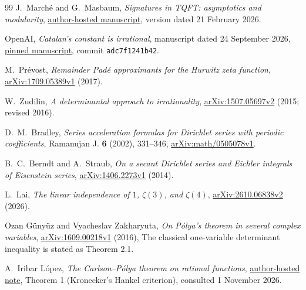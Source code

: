 \begin{thebibliography}{99}
 J.~March\'e and G.~Masbaum,
\emph{Signatures in TQFT: asymptotics and modularity},
\href{https://webusers.imj-prg.fr/~julien.marche/papiers/Sign_Mod.pdf}{author-hosted manuscript},
version dated 21 February 2026.

 OpenAI, \emph{Catalan's constant is irrational},
manuscript dated 24 September 2026,
\href{https://github.com/openai/math/blob/adc7f1241b42e322a6451854ab7e4b4c146bf78a/preprints/Catalans-constant-is-irrational-September-24-2026/paper.pdf}{pinned manuscript},
commit \texttt{adc7f1241b42}.

 M.~Pr\'evost,
\emph{Remainder Pad\'e approximants for the Hurwitz zeta function},
\href{https://arxiv.org/abs/1709.05389v1}{arXiv:1709.05389v1} (2017).

 W.~Zudilin,
\emph{A determinantal approach to irrationality},
\href{https://arxiv.org/abs/1507.05697v2}{arXiv:1507.05697v2}
(2015; revised 2016).

 D.~M.~Bradley,
\emph{Series acceleration formulas for Dirichlet series with periodic coefficients},
Ramanujan J. \textbf{6} (2002), 331--346,
\href{https://arxiv.org/abs/math/0505078v1}{arXiv:math/0505078v1}.

 B.~C.~Berndt and A.~Straub,
\emph{On a secant Dirichlet series and Eichler integrals of Eisenstein series},
\href{https://arxiv.org/abs/1406.2273v1}{arXiv:1406.2273v1} (2014).

 L.~Lai,
\emph{The linear independence of $1$, $\zeta(3)$, and $\zeta(4)$},
\href{https://arxiv.org/abs/2610.06838v2}{arXiv:2610.06838v2} (2026).

 Ozan G\"uny\"uz and Vyacheslav Zakharyuta,
\emph{On P\'olya's theorem in several complex variables},
\href{https://arxiv.org/abs/1609.00218v1}{arXiv:1609.00218v1} (2016),
The classical one-variable determinant inequality is stated as Theorem 2.1.

 A.~Iribar L\'opez,
\emph{The Carlson--P\'olya theorem on rational functions},
\href{https://people.math.ethz.ch/~airibar/Polya_Carlson.pdf}{author-hosted note},
Theorem 1 (Kronecker's Hankel criterion), consulted 1 November 2026.
\end{thebibliography}
